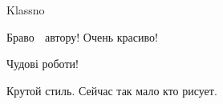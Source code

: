 
Klassno


Браво 👏 автору! Очень красиво!


Чудові роботи!


Крутой стиль. Сейчас так мало кто рисует.
